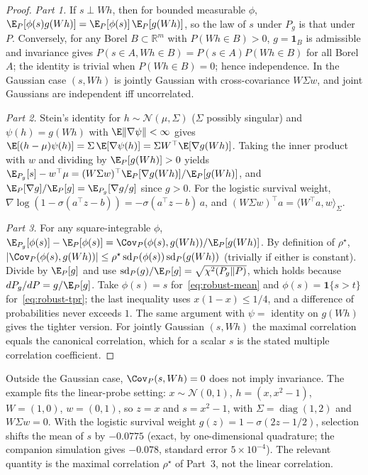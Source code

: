 \begin{proof}
\emph{Part 1.} If $s \perp Wh$, then for bounded measurable $\phi$, $\E_P[\phi(s) g(Wh)] = \E_P[\phi(s)]\,\E_P[g(Wh)]$, so the law of $s$ under $P_g$ is that under $P$. Conversely, for any Borel $B \subset \mathbb{R}^m$ with $P(Wh \in B) > 0$, $g = \mathbf{1}_B$ is admissible and invariance gives $P(s \in A, Wh \in B) = P(s \in A) P(Wh \in B)$ for all Borel $A$; the identity is trivial when $P(Wh \in B) = 0$; hence independence. In the Gaussian case $(s, Wh)$ is jointly Gaussian with cross-covariance $W \Sigma w$, and joint Gaussians are independent iff uncorrelated.

\emph{Part 2.} Stein's identity for $h \sim \mathcal{N}(\mu, \Sigma)$ ($\Sigma$ possibly singular) and $\psi(h) = g(Wh)$ with $\E\|\nabla\psi\| < \infty$ gives $\E[(h - \mu)\psi(h)] = \Sigma\, \E[\nabla \psi(h)] = \Sigma W^\top \E[\nabla g(Wh)]$. Taking the inner product with $w$ and dividing by $\E_P[g(Wh)] > 0$ yields $\E_{P_g}[s] - w^\top \mu = (W\Sigma w)^\top \E_P[\nabla g(Wh)]/\E_P[g(Wh)]$, and $\E_P[\nabla g]/\E_P[g] = \E_{P_g}[\nabla g / g]$ since $g > 0$. For the logistic survival weight, $\nabla \log(1 - \sigma(a^\top z - b)) = -\sigma(a^\top z - b)\, a$, and $(W \Sigma w)^\top a = \langle W^\top a, w\rangle_\Sigma$.

\emph{Part 3.} For any square-integrable $\phi$, $\E_{P_g}[\phi(s)] - \E_P[\phi(s)] = \Cov_P(\phi(s), g(Wh)) / \E_P[g(Wh)]$. By definition of $\rho^\star$, $|\Cov_P(\phi(s), g(Wh))| \le \rho^\star \operatorname{sd}_P(\phi(s))\operatorname{sd}_P(g(Wh))$ (trivially if either is constant). Divide by $\E_P[g]$ and use $\operatorname{sd}_P(g)/\E_P[g] = \sqrt{\chi^2(P_g\|P)}$, which holds because $dP_g/dP = g/\E_P[g]$. Take $\phi(s) = s$ for~\eqref{eq:robust-mean} and $\phi(s) = \mathbf{1}\{s > t\}$ for~\eqref{eq:robust-tpr}; the last inequality uses $x(1-x) \le 1/4$, and a difference of probabilities never exceeds $1$. The same argument with $\psi = $ identity on $g(Wh)$ gives the tighter version. For jointly Gaussian $(s, Wh)$ the maximal correlation equals the canonical correlation, which for a scalar $s$ is the stated multiple correlation coefficient.
\end{proof}

\begin{remark}\label{rem:uncorrelated}
Outside the Gaussian case, $\Cov_P(s, Wh) = 0$ does not imply invariance. The example fits the linear-probe setting: $x \sim \mathcal{N}(0,1)$, $h = (x, x^2 - 1)$, $W = (1, 0)$, $w = (0, 1)$, so $z = x$ and $s = x^2 - 1$, with $\Sigma = \operatorname{diag}(1, 2)$ and $W\Sigma w = 0$. With the logistic survival weight $g(z) = 1 - \sigma(2z - 1/2)$, selection shifts the mean of $s$ by $-0.0775$ (exact, by one-dimensional quadrature; the companion simulation gives $-0.078$, standard error $5 \times 10^{-4}$). The relevant quantity is the maximal correlation $\rho^\star$ of Part~3, not the linear correlation.
\end{remark}

